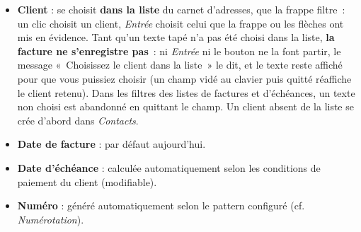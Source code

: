 \documentclass[a4paper,11pt,oneside]{article}
\begin{document}
\begin{itemize}
    \item \textbf{Client} : se choisit \textbf{dans la liste} du carnet d'adresses, que la frappe filtre~: un clic choisit un client, \emph{Entrée} choisit celui que la frappe ou les flèches ont mis en évidence. Tant qu'un texte tapé n'a pas été choisi dans la liste, \textbf{la facture ne s'enregistre pas}~: ni \emph{Entrée} ni le bouton ne la font partir, le message «~Choisissez le client dans la liste~» le dit, et le texte reste affiché pour que vous puissiez choisir (un champ vidé au clavier puis quitté réaffiche le client retenu). Dans les filtres des listes de factures et d'échéances, un texte non choisi est abandonné en quittant le champ. Un client absent de la liste se crée d'abord dans \emph{Contacts}.
    \item \textbf{Date de facture} : par défaut aujourd'hui.
    \item \textbf{Date d'échéance} : calculée automatiquement selon les conditions de paiement du client (modifiable).
    \item \textbf{Numéro} : généré automatiquement selon le pattern configuré (cf. \emph{Numérotation}).

\end{itemize}
\end{document}
